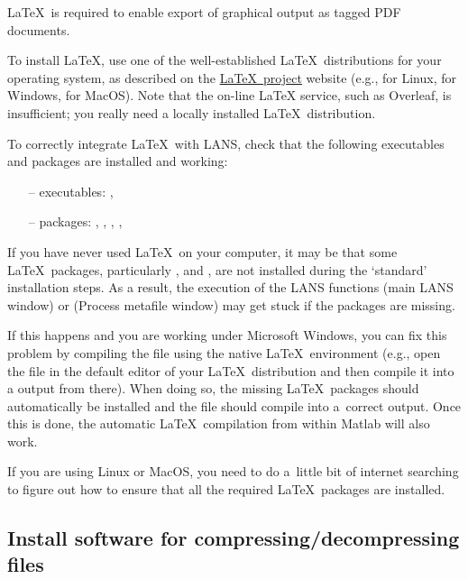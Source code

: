 \goldbox{}
\LaTeX\ is required to enable export of graphical output as tagged PDF documents. 
\tcbe

\s To install \LaTeX, use one of the well-established \LaTeX\ distributions for your operating system, as described on the \href{https://www.latex-project.org/get/}{\LaTeX\ project} website (e.g.,  for Linux,  for Windows,  for MacOS). Note that the on-line LaTeX service, such as Overleaf, is insufficient; you really need a locally installed \LaTeX\ distribution.
 
\s To correctly integrate \LaTeX\ with LANS, check that the following executables and packages are installed and working:
 
\begin{itemize}
\item[--] executables: , 
\item[--] packages: , , , , 
\end{itemize}
 
\nb\bul
If you have never used \LaTeX\ on your computer, it may be that some \LaTeX\ packages, parti\-cu\-larly ,  and , are not installed during the `standard' installation steps. As a result, the execution of the LANS functions  (main LANS window) or  (Process metafile window) may get stuck if the packages are missing. 

\bul If this happens and you are working under Microsoft Windows, you can fix this problem by compiling the  file using the native \LaTeX\ environment (e.g., open the  file in the default editor of your \LaTeX\ distribution and then compile it into a  output from there). When doing so, the missing \LaTeX\ packages should automatically be installed and the  file should compile into a~correct  output. Once this is done, the automatic \LaTeX\ compilation from within Matlab will also work. 

\bul If you are using Linux or MacOS, you need to do a~little bit of internet searching to figure out how to ensure that all the required \LaTeX\ packages are installed.


\subsection{Install software for compressing/decompressing files}
\setcounter{step}{0}

